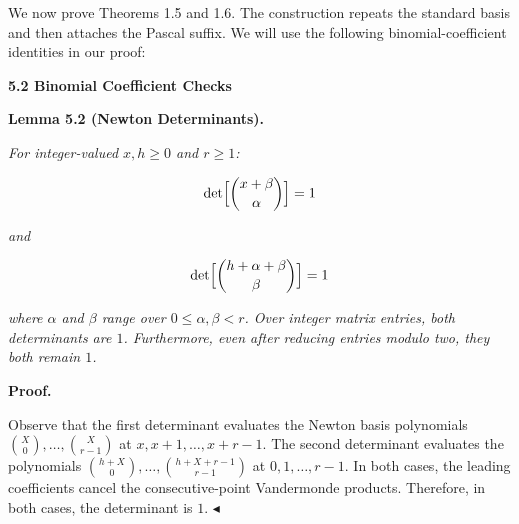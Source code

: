 We now prove Theorems 1.5 and 1.6. The construction repeats the standard basis and then attaches the Pascal suffix. We will use the following binomial-coefficient identities in our proof:\par






\par\medskip\noindent\textbf{
5.2 Binomial Coefficient Checks}\par





\par\medskip\noindent\textbf{
\textbf{Lemma 5.2}\textbf{ }(Newton Determinants)\textbf{.}
}\par



\emph{For integer-valued $x,h\geq 0$ and $r\geq 1$:}\par


\[\begin{gathered}
\det\Bigl[\binom{x+\beta}{\alpha}\Bigr]=1
\end{gathered}\]


\emph{and}\par


\[\begin{gathered}
\det\Bigl[\binom{h+\alpha+\beta}{\beta}\Bigr]=1
\end{gathered}\]


\emph{where $\alpha$ and $\beta$ range over $0\leq\alpha,\beta<r$. Over integer matrix entries, both determinants are $1$. Furthermore, even after reducing entries modulo two, they both remain $1$.}\par






\par\medskip\noindent\textbf{Proof.}\par




Observe that the first determinant evaluates the Newton basis polynomials $\binom{X}{0},\ldots,\binom{X}{r-1}$ at $x,x+1,\ldots,x+r-1$. The second determinant evaluates the polynomials $\binom{h+X}{0},\ldots,\binom{h+X+r-1}{r-1}$ at $0,1,\ldots,r-1$. In both cases, the leading coefficients cancel the consecutive-point Vandermonde products. Therefore, in both cases, the determinant is $1$.
$\blacktriangleleft$\par



